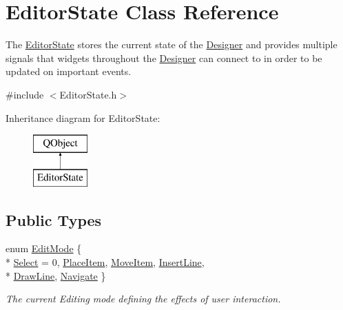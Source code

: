 \hypertarget{class_editor_state}{\section{Editor\-State Class Reference}
\label{class_editor_state}
}


The \hyperlink{class_editor_state}{Editor\-State} stores the current state of the \hyperlink{class_designer}{Designer} and provides multiple signals that widgets throughout the \hyperlink{class_designer}{Designer} can connect to in order to be updated on important events.  




{\ttfamily \#include $<$Editor\-State.\-h$>$}

Inheritance diagram for Editor\-State\-:\begin{figure}[H]
\begin{center}
\leavevmode
\includegraphics[height=2.000000cm]{class_editor_state}
\end{center}
\end{figure}
\subsection*{Public Types}
\begin{DoxyCompactItemize}
\item 
enum \hyperlink{class_editor_state_a30123e595784b2228edc2a0c2b46ab28}{Edit\-Mode} \{ \\*
\hyperlink{class_editor_state_a30123e595784b2228edc2a0c2b46ab28a0f056b27d234a6fad009db51c9f0ca16}{Select} = 0, 
\hyperlink{class_editor_state_a30123e595784b2228edc2a0c2b46ab28a3fbf76edee5b880159781851f7f3196d}{Place\-Item}, 
\hyperlink{class_editor_state_a30123e595784b2228edc2a0c2b46ab28a38dca5d68021a37ebb69ebbd8a2544b2}{Move\-Item}, 
\hyperlink{class_editor_state_a30123e595784b2228edc2a0c2b46ab28a09c13572277c714c0e5d9c4e36725f4a}{Insert\-Line}, 
\\*
\hyperlink{class_editor_state_a30123e595784b2228edc2a0c2b46ab28a575ea0fbd4fa6f8baa98a8f9817acb79}{Draw\-Line}, 
\hyperlink{class_editor_state_a30123e595784b2228edc2a0c2b46ab28a3ba8f119a9df84447a32145998ec62dd}{Navigate}
 \}
\begin{DoxyCompactList}\small\item\em The current Editing mode defining the effects of user interaction. \end{DoxyCompactList}\end{DoxyCompactItemize}
